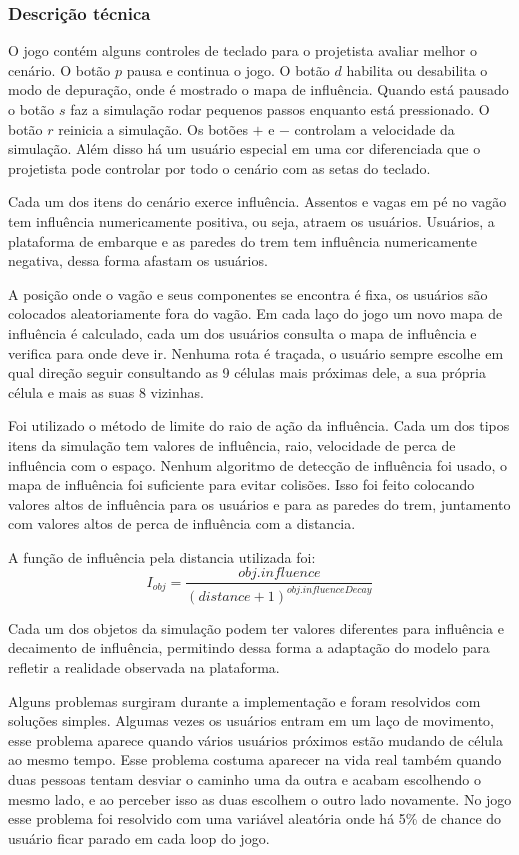 \documentclass[a4paper]{article}
\begin{document}
\subsubsection{Descrição técnica}

O jogo contém alguns controles de teclado para o projetista avaliar melhor o cenário. O botão $p$ pausa e continua o jogo. O botão $d$ habilita ou desabilita o modo de depuração, onde é mostrado o mapa de influência. Quando está pausado o botão $s$ faz a simulação rodar pequenos passos enquanto está pressionado. O botão $r$ reinicia a simulação. Os botões $+$ e $-$ controlam a velocidade da simulação. Além disso há um usuário especial em uma cor diferenciada que o projetista pode controlar por todo o cenário com as setas do teclado.

Cada um dos itens do cenário exerce influência. Assentos e vagas em pé no vagão tem influência numericamente positiva, ou seja, atraem os usuários. Usuários, a plataforma de embarque e as paredes do trem tem influência numericamente negativa, dessa forma afastam os usuários.

A posição onde o vagão e seus componentes se encontra é fixa, os usuários são colocados aleatoriamente fora do vagão. Em cada laço do jogo um novo mapa de influência é calculado, cada um dos usuários consulta o mapa de influência e verifica para onde deve ir. Nenhuma rota é traçada, o usuário sempre escolhe em qual direção seguir consultando as 9 células mais próximas dele, a sua própria célula e mais as suas 8 vizinhas.

Foi utilizado o método de limite do raio de ação da influência. Cada um dos tipos itens da simulação tem valores de influência, raio, velocidade de perca de influência com o espaço. Nenhum algoritmo de detecção de influência foi usado, o mapa de influência foi suficiente para evitar colisões. Isso foi feito colocando valores altos de influência para os usuários e para as paredes do trem, juntamento com valores altos de perca de influência com a distancia.

A função de influência pela distancia utilizada foi:
\[I_{obj} = \frac{obj.influence}{(distance + 1) ^{obj.influenceDecay}}\]

Cada um dos objetos da simulação podem ter valores diferentes para influência e decaimento de influência, permitindo dessa forma a adaptação do modelo para refletir a realidade observada na plataforma.

Alguns problemas surgiram durante a implementação e foram resolvidos com soluções simples. Algumas vezes os usuários entram em um laço de movimento, esse problema aparece quando vários usuários próximos estão mudando de célula ao mesmo tempo. Esse problema costuma aparecer na vida real também quando duas pessoas tentam desviar o caminho uma da outra e acabam escolhendo o mesmo lado, e ao perceber isso as duas escolhem o outro lado novamente. No jogo esse problema foi resolvido com uma variável aleatória onde há 5\% de chance do usuário ficar parado em cada loop do jogo.
\end{document}
